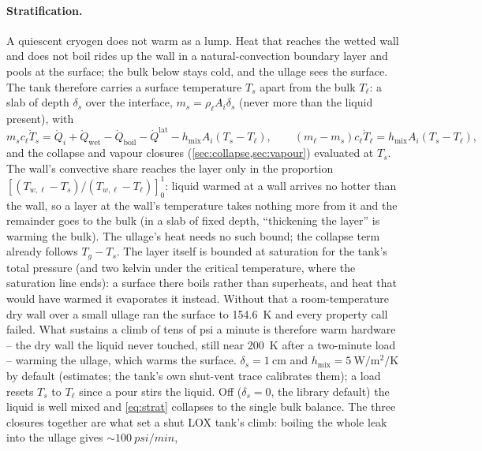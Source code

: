 \documentclass[11pt,a4paper]{article}
\newcommand{\Qdot}{\dot{Q}}
\begin{document}
\paragraph{Stratification.} A quiescent cryogen does not warm as a lump. Heat
that reaches the wetted wall and does not boil rides up the wall in a
natural-convection boundary layer and pools at the surface; the bulk below stays
cold, and the ullage sees the surface. The tank therefore carries a surface
temperature $T_s$ apart from the bulk $T_\ell$: a slab of depth $\delta_s$
over the interface, $m_s = \rho_\ell A_i \delta_s$ (never more than the liquid
present), with
\begin{equation}
  m_s c_\ell \dot T_s = \Qdot_i + \Qdot_{\mathrm{wet}} - \Qdot_{\mathrm{boil}} - \Qdot^{\mathrm{lat}} - h_{\mathrm{mix}} A_i (T_s - T_\ell),
  \qquad
  (m_\ell - m_s) c_\ell \dot T_\ell = h_{\mathrm{mix}} A_i (T_s - T_\ell),
  \label{eq:strat}
\end{equation}
and the collapse and vapour closures (\cref{sec:collapse,sec:vapour}) evaluated at
$T_s$. The wall's convective share reaches the layer only in the proportion
$[(T_{w,\ell}-T_s)/(T_{w,\ell}-T_\ell)]_0^1$: liquid warmed at a wall arrives no hotter
than the wall, so a layer at the wall's temperature takes nothing more from it and
the remainder goes to the bulk (in a slab of fixed depth, ``thickening the layer''
is warming the bulk). The ullage's heat needs no such bound; the collapse term
already follows $T_g - T_s$. The layer itself is bounded at saturation for the
tank's total pressure (and two kelvin under the critical temperature, where the
saturation line ends): a surface there boils rather than superheats, and heat
that would have warmed it evaporates it instead. Without that a room-temperature
dry wall over a small ullage ran the surface to \SI{154.6}{\kelvin} and every
property call failed. What sustains a climb of tens of psi a minute is
therefore warm hardware -- the dry wall the liquid never touched, still near
\SI{200}{\kelvin} after a two-minute load -- warming the ullage, which warms
the surface. $\delta_s=\SI{1}{\centi\metre}$ and $h_{\mathrm{mix}}=\SI{5}{\watt\per\square\metre\per\kelvin}$
by default (estimates; the tank's own shut-vent trace calibrates them); a load
resets $T_s$ to $T_\ell$ since a pour stirs the liquid. Off ($\delta_s=0$, the
library default) the liquid is well mixed and \cref{eq:strat} collapses to the
single bulk balance. The three closures together are what set a shut LOX tank's
climb: boiling the whole leak into the ullage gives $\sim\SI{100}{psi/min}$,
\end{document}
